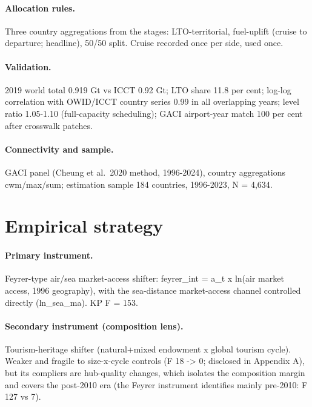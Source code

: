 \documentclass[12pt]{article}
\begin{document}
\paragraph{Allocation rules.} Three country aggregations from the stages:
LTO-territorial, fuel-uplift (cruise to departure; headline), 50/50 split.
Cruise recorded once per side, used once.
\paragraph{Validation.} 2019 world total 0.919 Gt vs ICCT 0.92 Gt; LTO share
11.8 per cent; log-log correlation with OWID/ICCT country series 0.99 in all
overlapping years; level ratio 1.05-1.10 (full-capacity scheduling); GACI
airport-year match 100 per cent after crosswalk patches.
\paragraph{Connectivity and sample.} GACI panel (Cheung et al.\ 2020 method,
1996-2024), country aggregations cwm/max/sum; estimation sample 184
countries, 1996-2023, N = 4,634.

\section{Empirical strategy}
\paragraph{Primary instrument.} Feyrer-type air/sea market-access shifter:
feyrer_int = a_t x ln(air market access, 1996 geography), with the sea-distance
market-access channel controlled directly (ln_sea_ma). KP F = 153.
\paragraph{Secondary instrument (composition lens).} Tourism-heritage shifter
(natural+mixed endowment x global tourism cycle). Weaker and fragile to
size-x-cycle controls (F 18 -> 0; disclosed in Appendix A), but its compliers
are hub-quality changes, which isolates the composition margin and covers the
post-2010 era (the Feyrer instrument identifies mainly pre-2010: F 127 vs 7).
\end{document}
